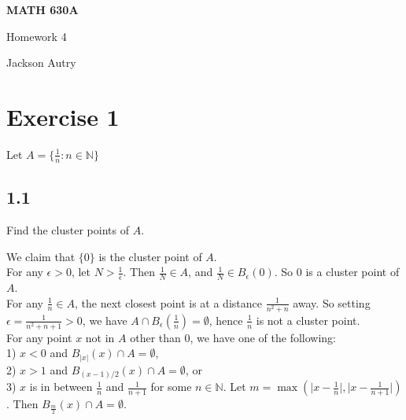 \documentclass[12pt,a4paper]{article}
\author{Jackson Autry}
\newcommand{\N}{\mathbb{N}}
\theoremstyle{plain}
\theoremstyle{remark}
\theoremstyle{definition}
\begin{document}

	
\begin{center}
	\textbf{MATH 630A} %
	
		Homework 4	%
		
		Jackson Autry
\end{center}

\section*{Exercise 1}

\begin{ques}
	Let $A = \{\frac{1}{n} : n \in \N \}$
\end{ques}

\subsection*{1.1}
\begin{ques}
	Find the cluster points of $A$.
\end{ques}
	
	We claim that $\{0\}$ is the cluster point of $A$.\\
	
	For any $\epsilon > 0$, let $N > \frac{1}{\epsilon}$. Then $\frac{1}{N} \in A$, and $\frac{1}{N} \in B_{\epsilon} (0)$. So $0$ is a cluster point of $A$.\\
	
	For any $\frac{1}{n} \in A$, the next closest point is at a distance $\frac{1}{n^2 + n}$ away. So setting $\epsilon = \frac{1}{n^2 + n + 1} > 0$, we have $A \cap B_{\epsilon}(\frac{1}{n}) = \emptyset$, hence $\frac{1}{n}$ is not a cluster point.\\
	
	For any point $x$ not in $A$ other than $0$, we have one of the following:\\
	1) $x < 0$ and $B_{\vert x \vert} (x) \cap A = \emptyset$,\\
	2) $x > 1$ and $B_{(x-1)/2}(x) \cap A = \emptyset$, or\\
	3) $x$ is in between $\frac{1}{n}$ and $\frac{1}{n+1}$ for some $n \in \N$. Let $m = \max(\vert x- \frac{1}{n}\vert, \vert x - \frac{1}{n+1}\vert)$. Then $B_{\frac{m}{2}}(x) \cap A = \emptyset$.\\
	
\end{document}
